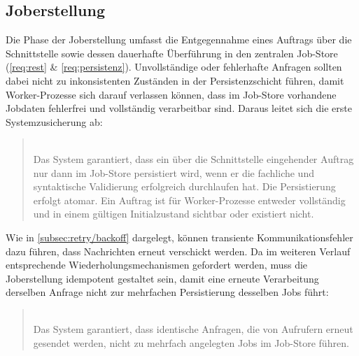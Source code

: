 \subsection{Joberstellung}
\label{subsec:anforderungen_joberstellung}
Die Phase der Joberstellung umfasst die Entgegennahme eines Auftrags über die Schnittstelle sowie dessen dauerhafte Überführung
in den zentralen Job-Store (\ref{req:rest} \& \ref{req:persistenz}).
Unvollständige oder fehlerhafte Anfragen sollten dabei nicht zu inkonsistenten Zuständen in der
Persistenzschicht führen, damit Worker-Prozesse sich darauf verlassen können, dass im Job-Store vorhandene Jobdaten fehlerfrei
und vollständig verarbeitbar sind.
Daraus leitet sich die erste Systemzusicherung ab:
\setcounter{zusicherung}{0}
\begin{quote}
     \\
    Das System garantiert, dass ein über die Schnittstelle eingehender Auftrag nur dann im Job-Store persistiert wird,
    wenn er die fachliche und syntaktische Validierung erfolgreich durchlaufen hat.
    Die Persistierung erfolgt atomar.
    Ein Auftrag ist für Worker-Prozesse entweder vollständig und in einem gültigen Initialzustand sichtbar oder existiert nicht.
\end{quote}
Wie in \cref{subsec:retry/backoff} dargelegt, können transiente Kommunikationsfehler dazu führen, dass Nachrichten erneut verschickt werden.
Da im weiteren Verlauf entsprechende Wiederholungsmechanismen gefordert werden, muss die Joberstellung idempotent gestaltet sein,
damit eine erneute Verarbeitung derselben Anfrage nicht zur mehrfachen Persistierung desselben Jobs führt:
\begin{quote}
     \\
    Das System garantiert, dass identische Anfragen, die von Aufrufern erneut gesendet werden,
    nicht zu mehrfach angelegten Jobs im Job-Store führen.
\end{quote}

